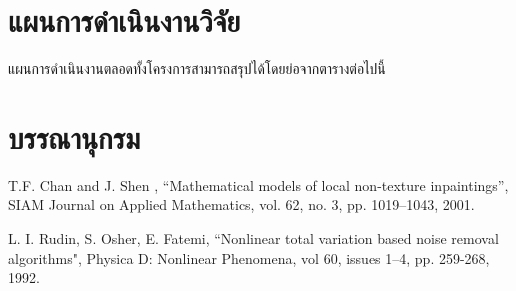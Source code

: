 \documentclass[hidelinks, a4paper,12pt]{article}
\numberwithin{equation}{section}							%
\numberwithin{equation}{section}
\begin{document}
{\section{แผนการดำเนินงานวิจัย}
\hspace{1cm} แผนการดำเนินงานตลอดทั้งโครงการสามารถสรุปได้โดยย่อจากตารางต่อไปนี้
\begin{center}
\end{center}


\section{บรรณานุกรม}

\renewcommand{\section}[2]{} %
\begin{thebibliography}{}
	
	T.F. Chan and J. Shen , “Mathematical models of local non-texture inpaintings”, SIAM Journal on Applied Mathematics, vol. 62, no. 3, pp. 1019–1043, 2001. 
	
	L. I. Rudin, S. Osher, E. Fatemi, “Nonlinear total variation based noise removal algorithms", Physica D: Nonlinear Phenomena, vol 60, issues 1–4, pp. 259-268, 1992. 
	

\end{thebibliography}}
\end{document}
